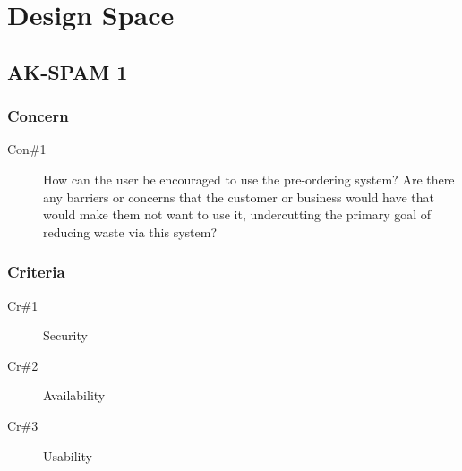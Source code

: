 \documentclass[11pt]{article}
\begin{document}
\newpage
\section{Design Space}
\label{sec:org549b6b1}
\subsection*{AK-SPAM 1}
\label{sec:orgc9802b8}
\subsubsection*{Concern}
\label{sec:orgd722be6}
\begin{description}
\item[{Con\#1}] How can the user be encouraged to use the pre-ordering
system? Are there any barriers or concerns that the
customer or business would have that would make them
not want to use it, undercutting the primary goal of
reducing waste via this system?
\end{description}
\subsubsection*{Criteria}
\label{sec:orgba3fdd0}
\begin{description}
\item[{Cr\#1}] Security
\item[{Cr\#2}] Availability
\item[{Cr\#3}] Usability
\end{description}
\end{document}
